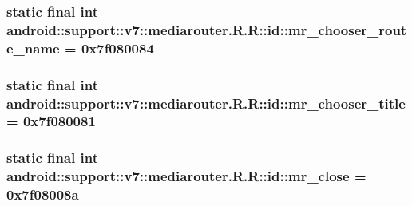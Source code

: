 \hypertarget{classandroid_1_1support_1_1v7_1_1mediarouter_1_1_r_1_1id_83781a882e66ffc76c37e3468d2f35e4}{
\subsubsection[{mr\_\-chooser\_\-route\_\-name}]{\setlength{\rightskip}{0pt plus 5cm}static final int android::support::v7::mediarouter.R.R::id::mr\_\-chooser\_\-route\_\-name = 0x7f080084}}
\label{classandroid_1_1support_1_1v7_1_1mediarouter_1_1_r_1_1id_83781a882e66ffc76c37e3468d2f35e4}


\hypertarget{classandroid_1_1support_1_1v7_1_1mediarouter_1_1_r_1_1id_facdd1b5dbe63880118fd33e24970482}{
\subsubsection[{mr\_\-chooser\_\-title}]{\setlength{\rightskip}{0pt plus 5cm}static final int android::support::v7::mediarouter.R.R::id::mr\_\-chooser\_\-title = 0x7f080081}}
\label{classandroid_1_1support_1_1v7_1_1mediarouter_1_1_r_1_1id_facdd1b5dbe63880118fd33e24970482}


\hypertarget{classandroid_1_1support_1_1v7_1_1mediarouter_1_1_r_1_1id_4c19c35e4fdb6560e83835640df65815}{
\subsubsection[{mr\_\-close}]{\setlength{\rightskip}{0pt plus 5cm}static final int android::support::v7::mediarouter.R.R::id::mr\_\-close = 0x7f08008a}}
\label{classandroid_1_1support_1_1v7_1_1mediarouter_1_1_r_1_1id_4c19c35e4fdb6560e83835640df65815}



